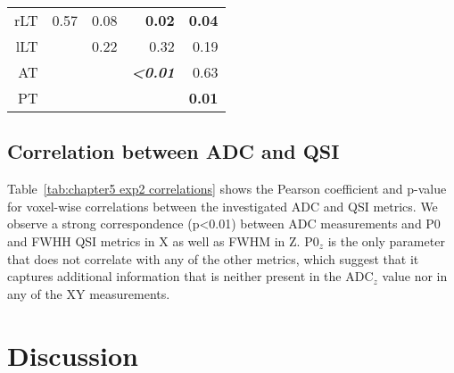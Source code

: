\begin{table}[tbp]
\begin{tableframe}
{\begin{tabular}{rrrrr}
        rLT   & 0.57  & 0.08  & \textbf{0.02}  & \textbf{0.04} \\
        lLT   &       & 0.22  & 0.32  & 0.19 \\
        AT    &       &       & \textbf{\emph{<0.01}}  & 0.63 \\
        PT    &       &       &       & \textbf{0.01} \\
        \bottomrule
        \end{tabular}%
        \label{tab:chap5exp2_qsiz hotelling}%
  }\hspace{0.2cm}
\end{tableframe}
\end{table}%

\subsection{Correlation between ADC and QSI}
\label{par:chapter5 exp2 correlation}
Table~\ref{tab:chapter5 exp2 correlations} shows the Pearson coefficient and p-value for voxel-wise correlations between the investigated ADC and QSI metrics. We observe a strong correspondence (p<0.01) between ADC measurements and P0 and FWHH QSI metrics in X as well as FWHM in Z. P0$_z$ is the only parameter that does not correlate with any of the other metrics, which suggest that it captures additional information that is neither present in the ADC$_z$ value nor in any of the XY measurements.%
\section{Discussion}

